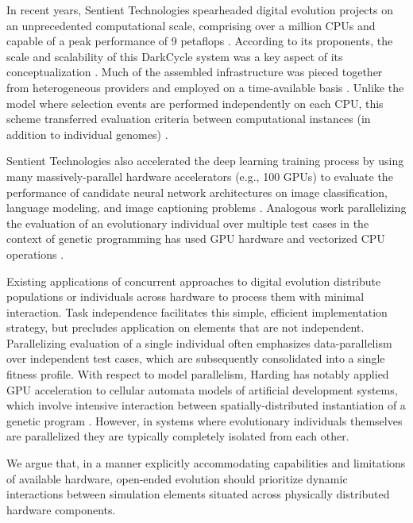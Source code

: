 In recent years, Sentient Technologies spearheaded digital evolution projects on an unprecedented computational scale, comprising over a million CPUs and capable of a peak performance of 9 petaflops \cite{miikkulainen2019evolving}.
According to its proponents, the scale and scalability of this DarkCycle system was a key aspect of its conceptualization \cite{gilbert2015artificial}.
Much of the assembled infrastructure was pieced together from heterogeneous providers and employed on a time-available basis \cite{blondeau2009distributed}.
Unlike the  model where selection events are performed independently on each CPU, this scheme transferred evaluation criteria between computational instances (in addition to individual genomes) \cite{hodjat2013distributed}.

Sentient Technologies also accelerated the deep learning training process by using many massively-parallel hardware accelerators (e.g., 100 GPUs) to evaluate the performance of candidate neural network architectures on image classification, language modeling, and image captioning problems \cite{miikkulainen2019evolving}.
Analogous work parallelizing the evaluation of an evolutionary individual over multiple test cases in the context of genetic programming has used GPU hardware and vectorized CPU operations
\cite{harding2007fast_springer, langdon2019continuous}.

Existing applications of concurrent approaches to digital evolution distribute populations or individuals across hardware to process them with minimal interaction.
Task independence facilitates this simple, efficient implementation strategy, but precludes application on elements that are not independent.
Parallelizing evaluation of a single individual often emphasizes data-parallelism over independent test cases, which are subsequently consolidated into a single fitness profile.
With respect to model parallelism, Harding has notably applied GPU acceleration to cellular automata models of artificial development systems, which involve intensive interaction between spatially-distributed instantiation of a genetic program \cite{harding2007fast_ieee}.
However, in systems where evolutionary individuals themselves are parallelized they are typically completely isolated from each other.

We argue that, in a manner explicitly accommodating capabilities and limitations of available hardware, open-ended evolution should prioritize dynamic interactions between simulation elements situated across physically distributed hardware components.

